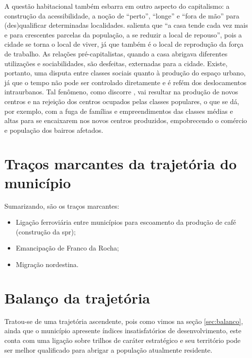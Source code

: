 	A questão habitacional também esbarra em outro aspecto do capitalismo: a construção da acessibilidade, a noção de ``perto'', ``longe'' e ``fora de mão'' para (des)qualificar determinadas localidades.  salienta que ``a casa tende cada vez mais e para crescentes parcelas da população, a se reduzir a local de repouso'', pois a cidade se torna o local de viver, já que também é o local de reprodução da força de trabalho. As relações pré-capitalistas, quando a casa abrigava diferentes utilizações e sociabilidades, são desfeitas, externadas para a cidade. Existe, portanto, uma disputa entre classes sociais quanto à produção do espaço urbano, já que o tempo não pode ser controlado diretamente e é refém dos deslocamentos intraurbanos. Tal fenômeno, como discorre , vai resultar na produção de novos centros e na rejeição dos centros ocupados pelas classes populares, o que se dá, por exemplo, com a fuga de famílias e empreendimentos das classes médias e altas para se encaixarem nos novos centros produzidos, empobrecendo o comércio e população dos bairros afetados.
	
	\section{Traços marcantes da trajetória do município} \label{sec:tracos-sumario}
	
	Sumarizando, são os traços marcantes:
	
	\begin{itemize}
		\item Ligação ferroviária entre municípios para escoamento da produção de café (construção da \gls{spr});
		\item Emancipação de Franco da Rocha;
		\item Migração nordestina.
	\end{itemize}
	
	\section{Balanço da trajetória}
		
	Tratou-se de uma trajetória ascendente, pois como vimos na seção \ref{sec:balanco}, ainda que o município apresente índices insatisfatórios de desenvolvimento, este conta com uma ligação sobre trilhos de caráter estratégico e seu território pode ser melhor qualificado para abrigar a população atualmente residente.
	
